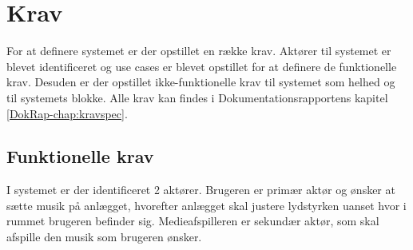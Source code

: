 \chapter{Krav}
\label{chap:krav}

%
%

For at definere systemet er der opstillet en række krav. Aktører til systemet er blevet identificeret og use cases er blevet opstillet for at definere de funktionelle krav. Desuden er der opstillet ikke-funktionelle krav til systemet som helhed og til systemets blokke.\newline
Alle krav kan findes i Dokumentationsrapportens kapitel \vref{DokRap-chap:kravspec}.


\section{Funktionelle krav}
I systemet er der identificeret 2 aktører.\newline
Brugeren er primær aktør og ønsker at sætte musik på anlægget, hvorefter anlægget skal justere lydstyrken uanset hvor i rummet brugeren befinder sig.\newline
Medieafspilleren er sekundær aktør, som skal afspille den musik som brugeren ønsker.

